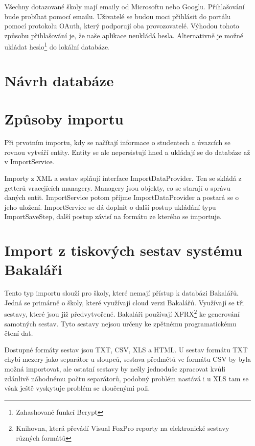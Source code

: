 Všechny dotazované školy mají emaily od Microsoftu nebo Googlu.
Přihlašování bude probíhat pomocí emailu. Uživatelé se budou moci přihlásit do portálu pomocí protokolu OAuth, který podporují oba provozovatelé. Výhodou tohoto způsobu přihlašování je, že naše aplikace neukládá hesla. Alternativně je možné ukládat heslo\footnote{Zahashované funkcí Bcrypt} do lokální databáze.



\section{Návrh databáze}




\section{Způsoby importu}
Při prvotním importu, kdy se načítají informace o studentech a úvazcích se rovnou vytváří entity. Entity se ale nepersistují hned a ukládají se do databáze až v ImportService.

Importy z XML a sestav splňují interface ImportDataProvider. Ten se skládá z getterů vracejících managery. Managery jsou objekty, co se starají o správu daných entit. ImportService potom příjme ImportDataProvider a postará se o jeho uložení. ImportService se dá doplnit o další postup ukládání typu ImportSaveStep, další postup závisí na formátu ze kterého se importuje.

\section{Import z tiskových sestav systému Bakaláři}
Tento typ importu slouží pro školy, které nemají přístup k databázi Bakalářů. 
Jedná se primárně o školy, které využívají cloud verzi Bakalářů. Využívají se tři sestavy, které jsou již předvytvořené. Bakaláři používají XFRX\footnote{Knihovna, která převádí Visual FoxPro reporty na elektronické sestavy různých formátů} ke generování samotných sestav. Tyto sestavy nejsou určeny ke zpětnému programatickému čtení dat.

Dostupné formáty sestav jsou TXT, CSV, XLS a HTML. U sestav formátu TXT chybí mezery jako separátor u sloupců, sestava předmětů ve formátu CSV by byla možná importovat, ale ostatní sestavy by nešly jednoduše zpracovat kvůli zdánlivě náhodnému počtu separátorů, podobný problém nastává i u XLS tam se však ještě vyskytuje problém se sloučenými poli.

